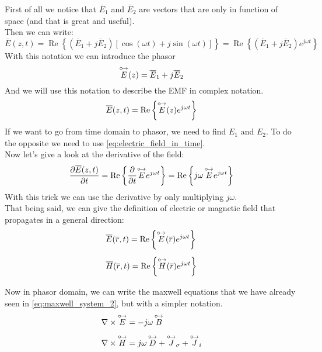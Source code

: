 First of all we notice that $\overline{E}_1$ and $\overline{E}_2$ are vectors that are only in function of space (and that is great and useful).\\
Then we can write:
\begin{equation}
    \overline{E}(z,t)=\operatorname{Re}\left\{(\overline{E}_1+j\overline{E}_2)[\cos(\omega t)+j \sin(\omega t)]\right\}=\operatorname{Re}\left\{(\overline{E}_1+j\overline{E}_2)e^{j\omega t}\right\}
\end{equation}
With this notation we can introduce the phasor 
\begin{equation}
\overset{\mathbin {{\circ \mkern-2.5mu\rightarrow}}}{E}(z)=\overline{E}_1+j\overline{E}_2
\end{equation}
And we will use this notation to describe the EMF in complex notation.
\begin{equation}\label{eq:electric_field_in_time}
    \overline{E}(z,t)=\operatorname{Re}\left\{\overset{\mathbin {{\circ \mkern-2.5mu\rightarrow}}}{E}(z)e^{j\omega t}\right\}
\end{equation}
If we want to go from time domain to phasor, we need to find $E_1$ and $E_2$. To do the opposite we need to use \cref{eq:electric_field_in_time}.\\
Now let's give a look at the derivative of the field:
\begin{equation}
    \frac{\partial\overline{E}(z,t)}{\partial t}=\operatorname{Re}\left\{\frac{\partial}{\partial t}\overset{\mathbin {{\circ \mkern-2.5mu\rightarrow}}}{E}e^{j\omega t}\right\}=\operatorname{Re}\left\{j\omega\,\overset{\mathbin {{\circ \mkern-2.5mu\rightarrow}}}{E}e^{j\omega t}\right\}
\end{equation}
With this trick we can use the derivative by only multiplying $j\omega$.\\
That being said, we can give the definition of electric or magnetic field that propagates in a general direction:
\begin{align}
    \begin{split}
        &\overline{E}(\overline{r},t)=\operatorname{Re}\left\{\overset{\mathbin {{\circ \mkern-2.5mu\rightarrow}}}{E}(\overline{r})e^{j\omega t}\right\}\\[5pt]
        &\overline{H}(\overline{r},t)=\operatorname{Re}\left\{\overset{\mathbin {{\circ \mkern-2.5mu\rightarrow}}}{H}(\overline{r})e^{j\omega t}\right\}\\[5pt]
    \end{split}
\end{align}
Now in phasor domain, we can write the maxwell equations that we have already seen in \cref{eq:maxwell_system_2}, but with a simpler notation.
\begin{align}\label{eq:maxwell_equation_in_phasor}
    \begin{split}
        &\nabla\times\overset{\mathbin {{\circ \mkern-2.5mu\rightarrow}}}{E}=-j\omega \,\overset{\mathbin {{\circ \mkern-2.5mu\rightarrow}}}{B}\\[5pt]
        &\nabla\times\overset{\mathbin {{\circ \mkern-2.5mu\rightarrow}}}{H}=j\omega \,\overset{\mathbin {{\circ \mkern-2.5mu\rightarrow}}}{D}+\overset{\mathbin {{\circ \mkern-2.5mu\rightarrow}}}{J}_\sigma+\overset{\mathbin {{\circ \mkern-2.5mu\rightarrow}}}{J}_i\\[5pt]
    \end{split}
\end{align}

